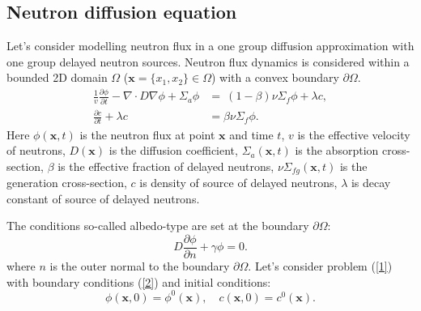 \documentclass[runningheads]{llncs}
\begin{document}
\subsection{Neutron diffusion equation}

Let's consider modelling neutron flux in a one group diffusion approximation with one group delayed neutron sources. Neutron flux dynamics is considered within a bounded 2D domain  $\Omega$ ($\bm x = \{x_1, x_2\} \in \Omega$) with a convex boundary $\partial \Omega$.
 \begin{equation}
\begin{split}
 \frac{1}{v} \frac{\partial \phi}{\partial t} -  \nabla \cdot D \nabla \phi + \Sigma_{a} \phi &=   \ (1-\beta) \nu \Sigma_{f} \phi + \lambda c, \\
\frac{\partial c}{\partial t} + \lambda c &= \beta \nu \Sigma_{f} \phi.
\end{split}
\end{equation} 
Here $\phi(\bm x,t)$ is the neutron flux at point $\bm x$ and time $t$,
$v$ is the effective velocity of neutrons,
$D(\bm x)$ is the diffusion coefficient, 
$\Sigma_{a}(\bm x,t)$ is the absorption cross-section,
$\beta$ is the effective fraction of delayed neutrons, 
$\nu\Sigma_{fg}(\bm x,t)$ is the generation cross-section,
$c$ is density of source of delayed neutrons, 
$\lambda$  is decay constant of source of delayed neutrons.

The conditions so-called albedo-type are set at the boundary $\partial \Omega$:
\begin{equation}
 D\frac{\partial \phi}{\partial n} + \gamma \phi = 0.
\end{equation}
where $n$ is the outer normal to the boundary $\partial \Omega$.
Let's consider problem (\ref{1}) with boundary conditions (\ref{2}) and initial conditions:
\begin{equation}
 \phi(\bm x,0) = \phi^0(\bm x),  \quad  
 c(\bm x, 0) = c^0(\bm x).
\end{equation} 

\end{document}
